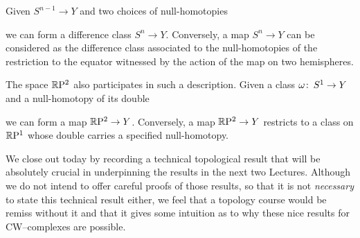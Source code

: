 \begin{example}
Given $S^{n-1} \to Y$ and two choices of null-homotopies
\begin{center}
\end{center}
we can form a difference class $S^n \to Y$.
Conversely, a map $S^n \to Y$ can be considered as the difference class associated to the null-homotopies of the restriction to the equator witnessed by the action of the map on two hemispheres.
\end{example}

\begin{example}
The space $\mathbb R \mathrm{P}^2$ also participates in such a description.
Given a class $\omega\colon\thinspace S^1 \to Y$ and a null-homotopy of its double
\begin{center}
\end{center}
we can form a map $\mathbb R \mathrm{P}^2 \to Y$.
Conversely, a map $\mathbb R \mathrm{P}^2 \to Y$ restricts to a class on $\mathbb R \mathrm{P}^1$ whose double carries a specified null-homotopy.
\end{example}

We close out today by recording a technical topological result that will be absolutely crucial in underpinning the results in the next two Lectures.
Although we do not intend to offer careful proofs of those results, so that it is not \emph{necessary} to state this technical result either, we feel that a topology course would be remiss without it and that it gives some intuition as to why these nice results for CW--complexes are possible.

